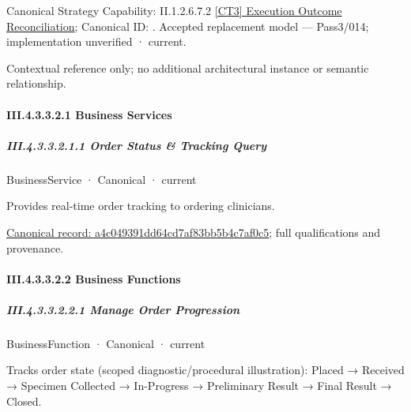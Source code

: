 {\small Canonical Strategy Capability: II.1.2.6.7.2 \hyperref[element:383de8b703bb448b96cf2ac9c31c90c5]{[CT3] Execution Outcome Reconciliation}; Canonical ID: \texttt{}. Accepted replacement model — Pass3/014; implementation unverified · current.}\par
Contextual reference only; no additional architectural instance or semantic relationship.\par
\paragraph*{III.4.3.3.2.1 Business Services}
\label{navigation:III.4.3.3.2.1}

\subparagraph*{III.4.3.3.2.1.1 Order Status \& Tracking Query}
\label{navigation:III.4.3.3.2.1.1}

\label{element:a4c049391dd64cd7af83bb5b4c7af0c5}
{\small BusinessService · Canonical · current}\par

Provides real-time order tracking to ordering clinicians.


{\footnotesize \href{../../../../../../../../continuum/business/business-service/a4c049391dd64cd7af83bb5b4c7af0c5.md}{Canonical record: a4c049391dd64cd7af83bb5b4c7af0c5}; full qualifications and provenance.}\par
\paragraph*{III.4.3.3.2.2 Business Functions}
\label{navigation:III.4.3.3.2.2}

\subparagraph*{III.4.3.3.2.2.1 Manage Order Progression}
\label{navigation:III.4.3.3.2.2.1}

\label{element:52f4b2dfb0c64e5aa4b378a9e63e0867}
{\small BusinessFunction · Canonical · current}\par

Tracks order state (scoped diagnostic/procedural illustration): Placed → Received → Specimen Collected → In-Progress → Preliminary Result → Final Result → Closed.


